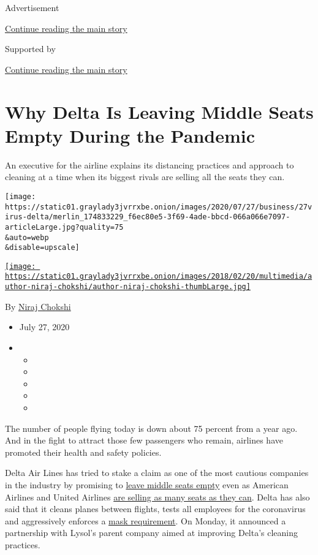 Advertisement

\protect\hyperlink{after-top}{Continue reading the main story}

Supported by

\protect\hyperlink{after-sponsor}{Continue reading the main story}

\hypertarget{why-delta-is-leaving-middle-seats-empty-during-the-pandemic}{%
\section{Why Delta Is Leaving Middle Seats Empty During the
Pandemic}\label{why-delta-is-leaving-middle-seats-empty-during-the-pandemic}}

An executive for the airline explains its distancing practices and
approach to cleaning at a time when its biggest rivals are selling all
the seats they can.

\texttt{[image: https://static01.graylady3jvrrxbe.onion/images/2020/07/27/business/27virus-delta/merlin\_174833229\_f6ec80e5-3f69-4ade-bbcd-066a066e7097-articleLarge.jpg?quality=75\\\&auto=webp\\\&disable=upscale]}

\href{https://www.nytimes3xbfgragh.onion/by/niraj-chokshi}{\texttt{[image: https://static01.graylady3jvrrxbe.onion/images/2018/02/20/multimedia/author-niraj-chokshi/author-niraj-chokshi-thumbLarge.jpg]}}

By \href{https://www.nytimes3xbfgragh.onion/by/niraj-chokshi}{Niraj
Chokshi}

\begin{itemize}
\item
  July 27, 2020
\item
  \begin{itemize}
  \item
  \item
  \item
  \item
  \item
  \end{itemize}
\end{itemize}

The number of people flying today is down about 75 percent from a year
ago. And in the fight to attract those few passengers who remain,
airlines have promoted their health and safety policies.

Delta Air Lines has tried to stake a claim as one of the most cautious
companies in the industry by promising to
\href{https://www.nytimes3xbfgragh.onion/2020/07/08/travel/airplanes-social-distancing-coronavirus.html}{leave
middle seats empty} even as American Airlines and United Airlines
\href{https://www.nytimes3xbfgragh.onion/2020/07/21/travel/crowded-flights-coronavirus.html}{are
selling as many seats as they can}. Delta has also said that it cleans
planes between flights, tests all employees for the coronavirus and
aggressively enforces a
\href{https://www.nytimes3xbfgragh.onion/2020/06/18/us/american-airlines-mask-brandon-straka.html}{mask
requirement}. On Monday, it announced a partnership with Lysol's parent
company aimed at improving Delta's cleaning practices.


